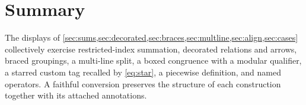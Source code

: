 \documentclass[11pt]{article}
\begin{document}
\section{Summary}
\label{sec:summary}

The displays of \cref{sec:sums,sec:decorated,sec:braces,sec:multline,sec:align,sec:cases}
collectively exercise restricted-index summation, decorated relations and arrows,
braced groupings, a multi-line split, a boxed congruence with a modular
qualifier, a starred custom tag recalled by \eqref{eq:star}, a piecewise
definition, and named operators. A faithful conversion preserves the structure
of each construction
together with its attached annotations.
\end{document}
